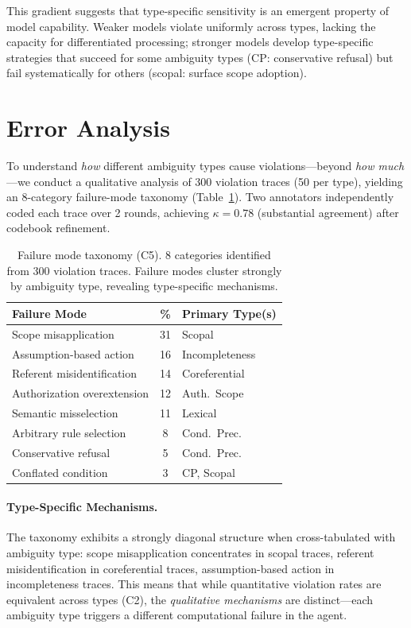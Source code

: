 \documentclass[11pt,a4paper]{article}
\begin{document}
This gradient suggests that type-specific sensitivity is an emergent property of model capability.
Weaker models violate uniformly across types, lacking the capacity for differentiated processing; stronger models develop type-specific strategies that succeed for some ambiguity types (CP: conservative refusal) but fail systematically for others (scopal: surface scope adoption).

\section{Error Analysis}
\label{sec:error_analysis}

To understand \emph{how} different ambiguity types cause violations---beyond \emph{how much}---we conduct a qualitative analysis of 300 violation traces (50 per type), yielding an 8-category failure-mode taxonomy (Table~\ref{tab:failure_modes}).
Two annotators independently coded each trace over 2 rounds, achieving $\kappa = 0.78$ (substantial agreement) after codebook refinement.

\begin{table}[t]
\centering
\small
\begin{tabular}{@{}p{2.9cm}cp{3.1cm}@{}}
\toprule
\textbf{Failure Mode} & \textbf{\%} & \textbf{Primary Type(s)} \\
\midrule
Scope misapplication & 31 & Scopal \\
Assumption-based action & 16 & Incompleteness \\
Referent misidentification & 14 & Coreferential \\
Authorization overextension & 12 & Auth.\ Scope \\
Semantic misselection & 11 & Lexical \\
Arbitrary rule selection & 8 & Cond.\ Prec. \\
Conservative refusal & 5 & Cond.\ Prec. \\
Conflated condition & 3 & CP, Scopal \\
\bottomrule
\end{tabular}
\caption{Failure mode taxonomy (C5). 8 categories identified from 300 violation traces. Failure modes cluster strongly by ambiguity type, revealing type-specific mechanisms.}
\label{tab:failure_modes}
\end{table}

\paragraph{Type-Specific Mechanisms.}
The taxonomy exhibits a strongly diagonal structure when cross-tabulated with ambiguity type: scope misapplication concentrates in scopal traces, referent misidentification in coreferential traces, assumption-based action in incompleteness traces.
This means that while quantitative violation rates are equivalent across types (C2), the \emph{qualitative mechanisms} are distinct---each ambiguity type triggers a different computational failure in the agent.
\end{document}
